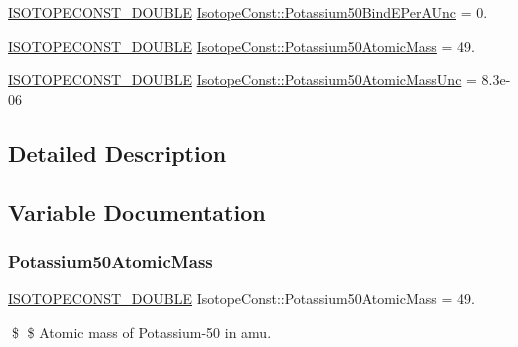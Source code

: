 \begin{DoxyCompactItemize}
\mbox{\hyperlink{group___isotope_const-_macros_ga8f45a7272ce02c0b4c65c44636ed719a}{I\+S\+O\+T\+O\+P\+E\+C\+O\+N\+S\+T\+\_\+\+D\+O\+U\+B\+LE}} \mbox{\hyperlink{group___isotope_const-_potassium-_k50_ga1252ff5f8aee218b773b3b86372ce047}{Isotope\+Const\+::\+Potassium50\+Bind\+E\+Per\+A\+Unc}} = 0.
\item 
\mbox{\hyperlink{group___isotope_const-_macros_ga8f45a7272ce02c0b4c65c44636ed719a}{I\+S\+O\+T\+O\+P\+E\+C\+O\+N\+S\+T\+\_\+\+D\+O\+U\+B\+LE}} \mbox{\hyperlink{group___isotope_const-_potassium-_k50_ga14f097797a26ca272ed460574f5b8f16}{Isotope\+Const\+::\+Potassium50\+Atomic\+Mass}} = 49.
\item 
\mbox{\hyperlink{group___isotope_const-_macros_ga8f45a7272ce02c0b4c65c44636ed719a}{I\+S\+O\+T\+O\+P\+E\+C\+O\+N\+S\+T\+\_\+\+D\+O\+U\+B\+LE}} \mbox{\hyperlink{group___isotope_const-_potassium-_k50_ga8537c7e3695404721624445481af5dfc}{Isotope\+Const\+::\+Potassium50\+Atomic\+Mass\+Unc}} = 8.\+3e-\/06
\end{DoxyCompactItemize}


\subsection{Detailed Description}


\subsection{Variable Documentation}
\mbox{\label{group___isotope_const-_potassium-_k50_ga14f097797a26ca272ed460574f5b8f16}} 
\subsubsection{\texorpdfstring{Potassium50\+Atomic\+Mass}{Potassium50AtomicMass}}
{\footnotesize\ttfamily \mbox{\hyperlink{group___isotope_const-_macros_ga8f45a7272ce02c0b4c65c44636ed719a}{I\+S\+O\+T\+O\+P\+E\+C\+O\+N\+S\+T\+\_\+\+D\+O\+U\+B\+LE}} Isotope\+Const\+::\+Potassium50\+Atomic\+Mass = 49.}

\$ \$ Atomic mass of Potassium-\/50 in amu. \mbox{\label{group___isotope_const-_potassium-_k50_ga8537c7e3695404721624445481af5dfc}} 
